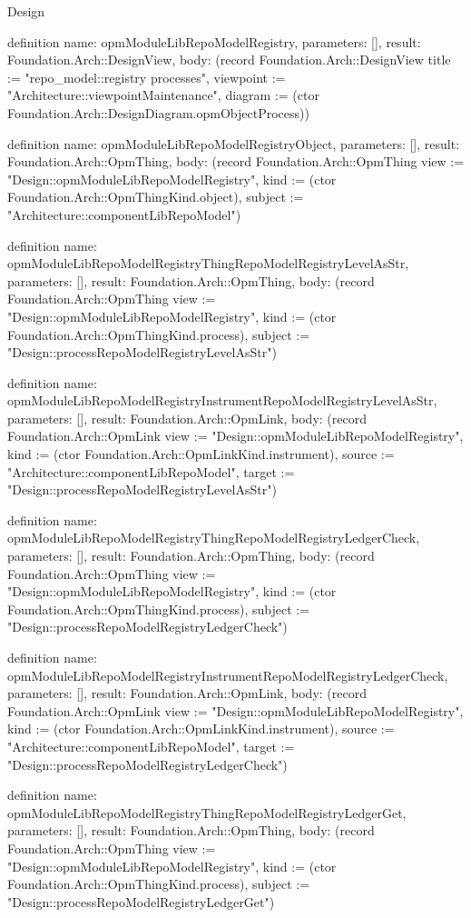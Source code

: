 \begin{lexlean}{Design}
\begin{semanticmodule}
definition{
  name: opmModuleLibRepoModelRegistry,
  parameters: [],
  result: Foundation.Arch::DesignView,
  body: (record Foundation.Arch::DesignView {title := "repo_model::registry processes", viewpoint := "Architecture::viewpointMaintenance", diagram := (ctor Foundation.Arch::DesignDiagram.opmObjectProcess)})
}

definition{
  name: opmModuleLibRepoModelRegistryObject,
  parameters: [],
  result: Foundation.Arch::OpmThing,
  body: (record Foundation.Arch::OpmThing {view := "Design::opmModuleLibRepoModelRegistry", kind := (ctor Foundation.Arch::OpmThingKind.object), subject := "Architecture::componentLibRepoModel"})
}

definition{
  name: opmModuleLibRepoModelRegistryThingRepoModelRegistryLevelAsStr,
  parameters: [],
  result: Foundation.Arch::OpmThing,
  body: (record Foundation.Arch::OpmThing {view := "Design::opmModuleLibRepoModelRegistry", kind := (ctor Foundation.Arch::OpmThingKind.process), subject := "Design::processRepoModelRegistryLevelAsStr"})
}

definition{
  name: opmModuleLibRepoModelRegistryInstrumentRepoModelRegistryLevelAsStr,
  parameters: [],
  result: Foundation.Arch::OpmLink,
  body: (record Foundation.Arch::OpmLink {view := "Design::opmModuleLibRepoModelRegistry", kind := (ctor Foundation.Arch::OpmLinkKind.instrument), source := "Architecture::componentLibRepoModel", target := "Design::processRepoModelRegistryLevelAsStr"})
}

definition{
  name: opmModuleLibRepoModelRegistryThingRepoModelRegistryLedgerCheck,
  parameters: [],
  result: Foundation.Arch::OpmThing,
  body: (record Foundation.Arch::OpmThing {view := "Design::opmModuleLibRepoModelRegistry", kind := (ctor Foundation.Arch::OpmThingKind.process), subject := "Design::processRepoModelRegistryLedgerCheck"})
}

definition{
  name: opmModuleLibRepoModelRegistryInstrumentRepoModelRegistryLedgerCheck,
  parameters: [],
  result: Foundation.Arch::OpmLink,
  body: (record Foundation.Arch::OpmLink {view := "Design::opmModuleLibRepoModelRegistry", kind := (ctor Foundation.Arch::OpmLinkKind.instrument), source := "Architecture::componentLibRepoModel", target := "Design::processRepoModelRegistryLedgerCheck"})
}

definition{
  name: opmModuleLibRepoModelRegistryThingRepoModelRegistryLedgerGet,
  parameters: [],
  result: Foundation.Arch::OpmThing,
  body: (record Foundation.Arch::OpmThing {view := "Design::opmModuleLibRepoModelRegistry", kind := (ctor Foundation.Arch::OpmThingKind.process), subject := "Design::processRepoModelRegistryLedgerGet"})
}


\end{semanticmodule}
\end{lexlean}
